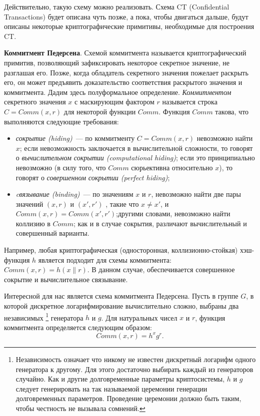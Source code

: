 \documentclass{article}
\begin{document}
Действительно, такую схему можно реализовать. Схема CT (Confidential Transactions)
будет описана чуть позже, а пока, чтобы двигаться дальше,
будут описаны некоторые криптографические примитивы, необходимые для построения CT.

{\bf Коммитмент Педерсена}.
Схемой коммитмента называется криптографический примитив, позволяющий зафиксировать
некоторое секретное значение, не разглашая его.
Позже, когда обладатель секретного значения пожелает раскрыть его,
он может предъявить доказательство соответствия раскрытого значения и коммитмента.
Дадим здесь полуформальное определение.
\textit{Коммитментом} секретного значения $x$ с маскирующим фактором $r$
называется строка $C = Comm(x, r)$ для некоторой функции $Comm$.
Функция $Comm$ такова,
 что выполняются следующие требования:
\begin{itemize}
  \item
   \textit{сокрытие (hiding)}~--- по коммитменту $C = Comm(x,r)$ невозможно найти $x$;
   если невозможность заключается в вычислительной сложности, то говорят о
   \textit{вычислительном сокрытии (computational hiding)};
   если это принципиально невозможно (в силу того, что $Comm$ сюрьективна
   относительно $x$), то говорят о \textit{совершенном сокрытии (perfect hiding)};
  \item
  \textit{cвязывание (binding)}~--- по значениям $x$ и $r$,
  невозможно найти две пары значений $(x, r)$ и $(x', r')$ , такие что $x \neq x'$,
  и $Comm(x,r) = Comm(x', r')$;другими словами, невозможно найти коллизию в $Comm$;
  как и в случае сокрытия, различают вычислительный и совершенный варианты.
\end{itemize}

Например, любая криптографическая (односторонная, коллизионно-стойкая) хэш-функция $h$ является подходит
для схемы коммитмента: $Comm(x, r) = h(x \parallel r)$. В данном случае,
обеспечивается совершенное сокрытие и вычислительное связывание.

Интересной для нас является схема коммитмента Педерсена.
Пусть в группе $G$, в которой дискретное логарифмирование вычислительно сложно,
 выбраны два независимых
\footnote{Независимость означает что никому не известен дискретный логарифм одного генератора к другому.
Для этого достаточно выбирать каждый из генераторов случайно.
Как и другие долговременные параметры криптосистемы,
$h$ и $g$ следует генерировать на так называемой церемонии генерации долговременных параметров.
Проведение церемонии должно быть таким, чтобы честность не вызывала сомнений.}
 генератора $h$ и $g$. Для натуральных чисел $x$ и $r$,
 функция коммитмента определяется следующим образом:
 $$
 Comm(x, r) = h^x g^r.
 $$
\end{document}
